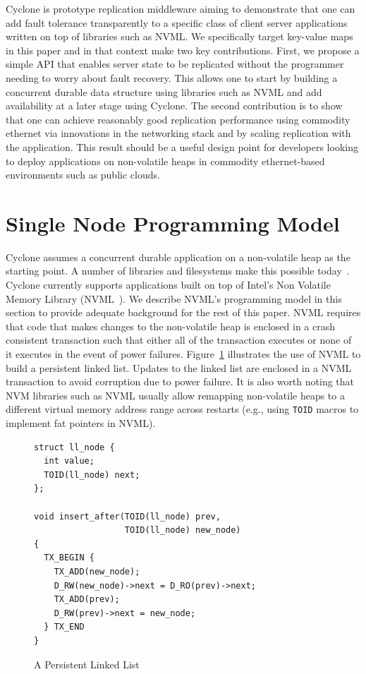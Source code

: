 \documentclass[10pt, preprint]{sigplanconf}
\begin{document}
Cyclone is prototype replication middleware aiming to demonstrate that one
can add fault tolerance transparently to a specific class of client server
applications written on top of libraries such as NVML. We specifically target
key-value maps in this paper and in that context make two key
contributions. First, we propose a simple API that enables server state to be
replicated without the programmer needing to worry about fault recovery. This
allows one to start by building a concurrent durable data structure using
libraries such as NVML and add availability at a later stage using Cyclone. The
second contribution is to show that one can achieve reasonably good replication 
performance using commodity ethernet via innovations in the networking stack and
by scaling replication with the application. This result should be a useful
design point for developers looking to deploy applications on non-volatile heaps
in commodity ethernet-based environments such as public clouds.

\section{Single Node Programming Model}
Cyclone assumes a concurrent durable application on a non-volatile heap as the
starting point. A number of libraries and filesystems make this possible
today~\cite{nvml, dax, pmfs, mnemosyne, nvheaps, cdds}. Cyclone currently
supports applications built on top of Intel's Non Volatile Memory Library
(NVML~\cite{nvml}). We describe NVML's programming model in this section to
provide adequate background for the rest of this paper. NVML requires 
that code that makes changes to the non-volatile heap is enclosed in a crash
consistent transaction such that either all of the transaction executes or none
of it executes in the event of power failures.
Figure~\ref{fig:example} illustrates the use of NVML to build a persistent
linked list. Updates to the linked list are enclosed in a NVML transaction to
avoid corruption due to power failure. It is also worth noting that NVM
libraries such as NVML usually allow remapping non-volatile heaps to a different
virtual memory address range across restarts (e.g., using {\tt TOID} macros to
implement fat pointers in NVML).

\begin{figure}
  { \scriptsize
\begin{verbatim}
struct ll_node {
  int value;
  TOID(ll_node) next;
};

void insert_after(TOID(ll_node) prev, 
                  TOID(ll_node) new_node)
{
  TX_BEGIN {
    TX_ADD(new_node);
    D_RW(new_node)->next = D_RO(prev)->next;
    TX_ADD(prev);
    D_RW(prev)->next = new_node;
  } TX_END
}

\end{verbatim}
  }
\vspace{-0.2in}
\caption{A Persistent Linked List}
\label{fig:example}
\end{figure}
\end{document}
